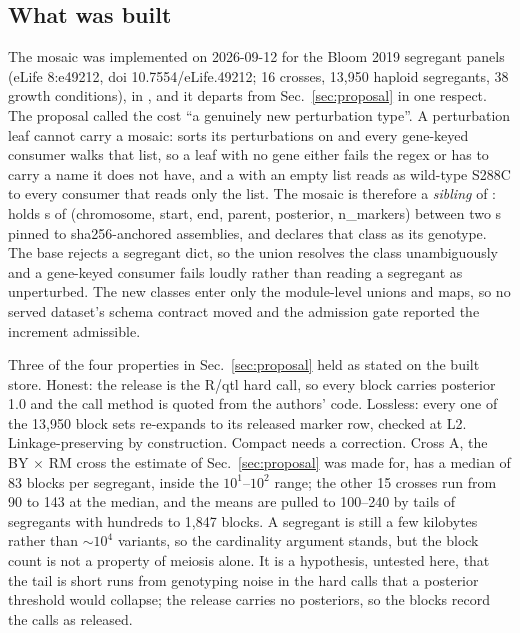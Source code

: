 \subsection{What was built}\label{sec:built}

The mosaic was implemented on 2026-09-12 for the Bloom 2019 segregant panels (eLife
8:e49212, doi 10.7554/eLife.49212; 16 crosses, 13,950 haploid segregants, 38 growth
conditions), in , and it departs from
Sec.~\ref{sec:proposal} in one respect. The proposal called the cost ``a genuinely new
perturbation type''. A perturbation leaf cannot carry a mosaic:  sorts its
perturbations on  and every gene-keyed consumer walks that
list, so a leaf with no gene either fails the regex or has to carry a name it does not
have, and a  with an empty list reads as wild-type S288C to every consumer
that reads only the list. The mosaic is therefore a \emph{sibling} of :
 holds s of (chromosome, start, end, parent,
posterior, n\_markers) between two s pinned to sha256-anchored
assemblies, and  declares that class as its genotype.
The base  rejects a segregant dict, so the union resolves the class
unambiguously and a gene-keyed consumer fails loudly rather than reading a segregant as
unperturbed. The new classes enter only the module-level unions and maps, so no served
dataset's schema contract moved and the admission gate reported the increment admissible.

Three of the four properties in Sec.~\ref{sec:proposal} held as stated on the built
store. Honest: the release is the R/qtl hard call, so every block carries posterior 1.0
and the call method is quoted from the authors' code. Lossless: every one of the 13,950
block sets re-expands to its released marker row, checked at L2. Linkage-preserving by
construction. Compact needs a correction. Cross A, the BY $\times$ RM cross the estimate
of Sec.~\ref{sec:proposal} was made for, has a median of 83 blocks per segregant, inside
the $10^1$--$10^2$ range; the other 15 crosses run from 90 to 143 at the median, and the
means are pulled to 100--240 by tails of segregants with hundreds to 1,847 blocks. A
segregant is still a few kilobytes rather than $\sim10^4$ variants, so the cardinality
argument stands, but the block count is not a property of meiosis alone. It is a
hypothesis, untested here, that the tail is short runs from genotyping noise in the hard
calls that a posterior threshold would collapse; the release carries no posteriors, so the
blocks record the calls as released.

